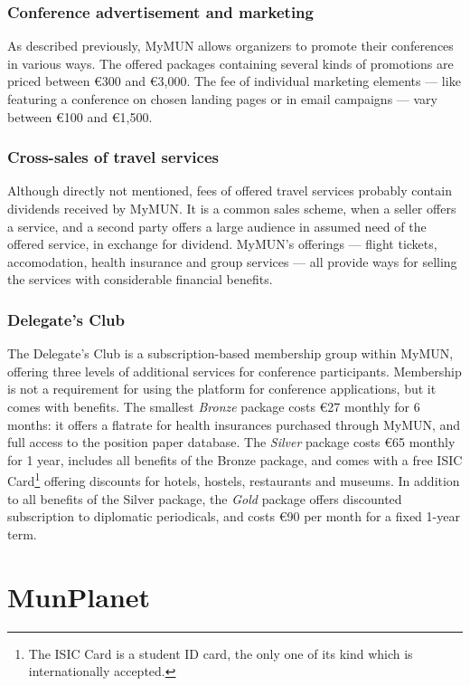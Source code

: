 \subsubsection{Conference advertisement and marketing}

As described previously, MyMUN allows organizers to promote their conferences in various ways. The offered packages containing several kinds of promotions are priced between €300 and €3,000. The fee of individual marketing elements — like featuring a conference on chosen landing pages or in email campaigns — vary between €100 and €1,500.

\subsubsection{Cross-sales of travel services}

Although directly not mentioned, fees of offered travel services probably contain dividends received by MyMUN. It is a common sales scheme, when a seller offers a service, and a second party offers a large audience in assumed need of the offered service, in exchange for dividend. MyMUN's offerings — flight tickets, accomodation, health insurance and group services — all provide ways for selling the services with considerable financial benefits.

\subsubsection{Delegate's Club}

The Delegate's Club is a subscription-based membership group within MyMUN, offering three levels of additional services for conference participants. Membership is not a requirement for using the platform for conference applications, but it comes with benefits. The smallest \emph{Bronze} package costs €27 monthly for 6 months: it offers a flatrate for health insurances purchased through MyMUN, and full access to the position paper database. The \emph{Silver} package costs €65 monthly for 1 year, includes all benefits of the Bronze package, and comes with a free ISIC Card\footnote{The ISIC Card is a student ID card, the only one of its kind which is internationally accepted.} offering discounts for hotels, hostels, restaurants and museums. In addition to all benefits of the Silver package, the \emph{Gold} package offers discounted subscription to diplomatic periodicals, and costs €90 per month for a fixed 1-year term.

\section{MunPlanet}

